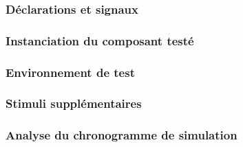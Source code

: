 \subsubsection{Déclarations et signaux}

\subsubsection{Instanciation du composant testé}

\subsubsection{Environnement de test}

\subsubsection{Stimuli supplémentaires}

\subsubsection{Analyse du chronogramme de simulation}
